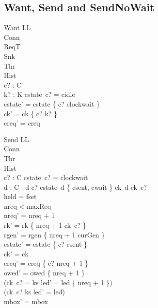 \documentclass[a4paper,10pt,fleqn]{article}
\begin{document}
\subsection{Want, Send and SendNoWait}

\begin{schema}{Want}
  \Delta LL \\
  \Xi Conn \\
  \Xi ReqT \\
  \Xi Snk \\
  \Xi Thr \\
  \Xi Hist \\
  c? : C \\
  k? : K
\where
  cstate~c? = cidle \\
  cstate' = cstate \oplus \{ c? \mapsto clockwait \} \\
  ck' = ck \oplus \{ c? \mapsto k? \} \\
  creq' = creq
\end{schema}

\begin{schema}{Send}
  \Delta LL \\
  \Xi Conn \\
  \Xi Thr \\
  \Xi Hist \\
  c? : C
\where
  cstate~c? = clockwait \\
  \forall d : C | d \neq c? \spot
    cstate~d \in \{ csent, cwait \} \implies ck~d \neq ck~c? \\
  held = fset \\
  nreq < maxReq \\
  nreq' = nreq + 1 \\
  rk' = rk \oplus \{ nreq + 1 \mapsto ck~c? \} \\
  rgen' = rgen \oplus \{ nreq + 1 \mapsto curGen \} \\
  cstate' = cstate \oplus \{ c? \mapsto csent \} \\
  ck' = ck \\
  creq' = creq \oplus \{ c? \mapsto nreq + 1 \} \\
  owed' = owed \cup \{ nreq + 1 \} \\
  (ck~c? = ks \implies led' = led \cup \{ nreq + 1 \}) \\
  (ck~c? \neq ks \implies led' = led) \\
  mbox' = mbox
\end{schema}
\end{document}
